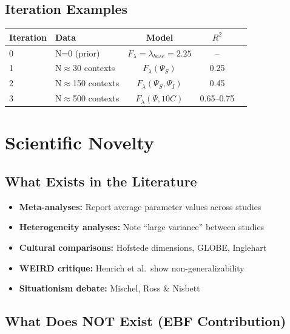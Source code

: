 \subsection{Iteration Examples}

\begin{center}
\begin{tabular}{llccc}
\toprule
\textbf{Iteration} & \textbf{Data} & \textbf{Model} & \textbf{$R^2$} \\
\midrule
0 & N=0 (prior) & $F_\lambda = \lambda_{base} = 2.25$ & -- \\
1 & N$\approx$30 contexts & $F_\lambda(\Psi_S)$ & 0.25 \\
2 & N$\approx$150 contexts & $F_\lambda(\Psi_S, \Psi_I)$ & 0.45 \\
3 & N$\approx$500 contexts & $F_\lambda(\Psi, 10C)$ & 0.65--0.75 \\
\bottomrule
\end{tabular}
\end{center}



\section{Scientific Novelty}
\label{sec:novelty}

\subsection{What Exists in the Literature}

\begin{itemize}
    \item \textbf{Meta-analyses:} Report average parameter values across studies
    \item \textbf{Heterogeneity analyses:} Note ``large variance'' between studies
    \item \textbf{Cultural comparisons:} Hofstede dimensions, GLOBE, Inglehart
    \item \textbf{WEIRD critique:} Henrich et al.~show non-generalizability
    \item \textbf{Situationism debate:} Mischel, Ross \& Nisbett
\end{itemize}

\subsection{What Does NOT Exist (EBF Contribution)}

